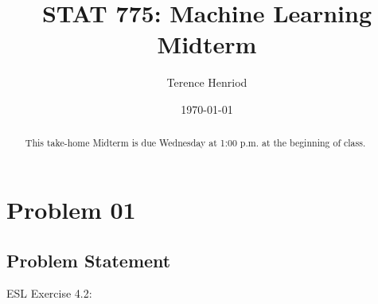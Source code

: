 \documentclass{article}
\title{STAT 775: Machine Learning \\ Midterm}
\author{Terence Henriod}
\date{\today}
\begin{document}
\clearpage            %
\maketitle            %
\thispagestyle{empty} %

\begin{abstract}
This take-home Midterm is due Wednesday at 1:00 p.m. at the beginning of class.
\end{abstract}

\newpage
\section{Problem 01}
\subsection{Problem Statement}
ESL Exercise 4.2:
\end{document}
